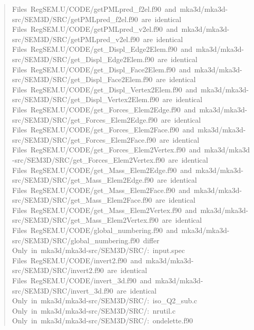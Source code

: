 \documentclass[10pt,a4paper,english]{article}
\begin{document}
\begin{quote}
{Files~RegSEM.U/CODE/getPMLpred{\_}f2el.f90~and~mka3d/mka3d-src/SEM3D/SRC/getPMLpred{\_}f2el.f90~are~identical~\\
Files~RegSEM.U/CODE/getPMLpred{\_}v2el.f90~and~mka3d/mka3d-src/SEM3D/SRC/getPMLpred{\_}v2el.f90~are~identical~\\
Files~RegSEM.U/CODE/get{\_}Displ{\_}Edge2Elem.f90~and~mka3d/mka3d-src/SEM3D/SRC/get{\_}Displ{\_}Edge2Elem.f90~are~identical~\\
Files~RegSEM.U/CODE/get{\_}Displ{\_}Face2Elem.f90~and~mka3d/mka3d-src/SEM3D/SRC/get{\_}Displ{\_}Face2Elem.f90~are~identical~\\
Files~RegSEM.U/CODE/get{\_}Displ{\_}Vertex2Elem.f90~and~mka3d/mka3d-src/SEM3D/SRC/get{\_}Displ{\_}Vertex2Elem.f90~are~identical~\\
Files~RegSEM.U/CODE/get{\_}Forces{\_}Elem2Edge.f90~and~mka3d/mka3d-src/SEM3D/SRC/get{\_}Forces{\_}Elem2Edge.f90~are~identical~\\
Files~RegSEM.U/CODE/get{\_}Forces{\_}Elem2Face.f90~and~mka3d/mka3d-src/SEM3D/SRC/get{\_}Forces{\_}Elem2Face.f90~are~identical~\\
Files~RegSEM.U/CODE/get{\_}Forces{\_}Elem2Vertex.f90~and~mka3d/mka3d-src/SEM3D/SRC/get{\_}Forces{\_}Elem2Vertex.f90~are~identical~\\
Files~RegSEM.U/CODE/get{\_}Mass{\_}Elem2Edge.f90~and~mka3d/mka3d-src/SEM3D/SRC/get{\_}Mass{\_}Elem2Edge.f90~are~identical~\\
Files~RegSEM.U/CODE/get{\_}Mass{\_}Elem2Face.f90~and~mka3d/mka3d-src/SEM3D/SRC/get{\_}Mass{\_}Elem2Face.f90~are~identical~\\
Files~RegSEM.U/CODE/get{\_}Mass{\_}Elem2Vertex.f90~and~mka3d/mka3d-src/SEM3D/SRC/get{\_}Mass{\_}Elem2Vertex.f90~are~identical~\\
Files~RegSEM.U/CODE/global{\_}numbering.f90~and~mka3d/mka3d-src/SEM3D/SRC/global{\_}numbering.f90~differ~\\
Only~in~mka3d/mka3d-src/SEM3D/SRC/:~input.spec~\\
Files~RegSEM.U/CODE/invert2.f90~and~mka3d/mka3d-src/SEM3D/SRC/invert2.f90~are~identical~\\
Files~RegSEM.U/CODE/invert{\_}3d.f90~and~mka3d/mka3d-src/SEM3D/SRC/invert{\_}3d.f90~are~identical~\\
Only~in~mka3d/mka3d-src/SEM3D/SRC/:~iso{\_}Q2{\_}sub.c~\\
Only~in~mka3d/mka3d-src/SEM3D/SRC/:~nrutil.c~\\
Only~in~mka3d/mka3d-src/SEM3D/SRC/:~ondelette.f90~\\
}
\end{quote}
\end{document}

